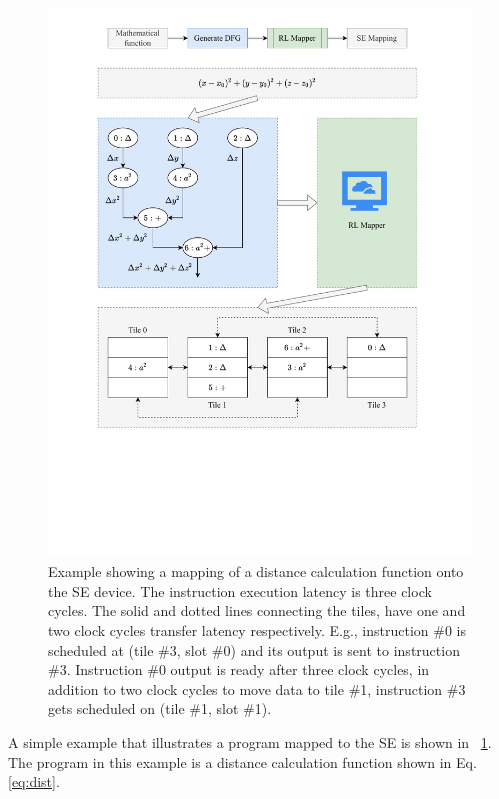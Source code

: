 \begin{figure}
  \centering
  \includegraphics[trim=70 180 70 25, clip, width=\linewidth]{fig/SE_example.pdf}
  \caption{
    Example showing a mapping of a distance calculation function onto the SE device.
    The instruction execution latency is three clock cycles.
    The solid and dotted lines connecting the tiles, have one and two clock cycles transfer latency respectively.
    E.g., instruction \#0 is scheduled at (tile \#3, slot \#0) and its output is sent to instruction \#3.
    Instruction \#0 output is ready after three clock cycles, in addition to two clock cycles to move data to tile \#1, instruction \#3 gets scheduled on (tile \#1, slot \#1).
  }
  \label{fig:se_example}
\end{figure}

A simple example that illustrates a program mapped to the SE is shown in \figurename~\ref{fig:se_example}.
The program in this example is a distance calculation function shown in Eq. \ref{eq:dist}.

